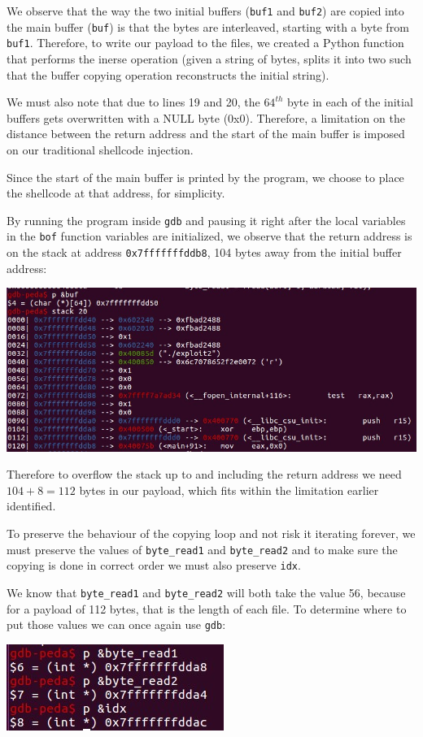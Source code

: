 \documentclass[12pt]{article}
\begin{document}
We observe that the way the two initial buffers (\texttt{buf1} and \texttt{buf2}) are copied into the main buffer (\texttt{buf}) is that the bytes are interleaved, starting with a byte from \texttt{buf1}. Therefore, to write our payload to the files, we created a Python function that performs the inerse operation (given a string of bytes, splits it into two such that the buffer copying operation reconstructs the initial string).

We must also note that due to lines 19 and 20, the $64^{th}$ byte in each of the initial buffers gets overwritten with a NULL byte (0x0). Therefore, a limitation on the distance between the return address and the start of the main buffer is imposed on our traditional shellcode injection. 

Since the start of the main buffer is printed by the program, we choose to place the shellcode at that address, for simplicity.

By running the program inside \texttt{gdb} and pausing it  right after the local variables in the \texttt{bof} function variables are initialized, we observe that the return address is on the stack at address \texttt{0x7fffffffddb8}, 104 bytes away from the initial buffer address:

\begin{center}
    \includegraphics[scale=0.75]{ex1-ret-addr-buf.jpg}
\end{center}
 
Therefore to overflow the stack up to and including the return address we need $104 + 8 = 112$ bytes in our payload, which fits within the limitation earlier identified.

To preserve the behaviour of the copying loop and not risk it iterating forever, we must preserve the values of \texttt{byte\_read1} and \texttt{byte\_read2} and to make sure the copying is done in correct order we must also preserve \texttt{idx}.

We know that \texttt{byte\_read1} and \texttt{byte\_read2} will both take the value 56, because for a payload of 112 bytes, that is the length of each file. To determine where to put those values we can once again use \texttt{gdb}:
\begin{center}
    \includegraphics{ex1-var-locations.jpg}
\end{center}
\end{document}
